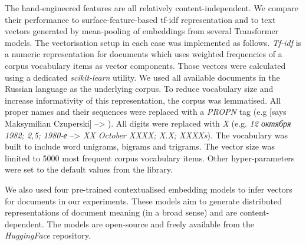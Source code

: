The hand-engineered features are all relatively content-independent. We compare their performance to surface-feature-based \gls{tf-idf} representation and to text vectors generated by mean-pooling of embeddings from several Transformer models. 
The vectorisation setup in each case was implemented as follows.
\label{pg:tfidf_meth}
\textit{Tf-idf} is a numeric representation for documents which uses weighted frequencies of a corpus vocabulary items as vector components. Those vectors were calculated using a dedicated \textit{scikit-learn} utility. We used all available documents in the Russian language as the underlying corpus. 
To reduce vocabulary size and increase informativity of this representation, the corpus was lemmatised. All proper names and their sequences were replaced with a \textit{PROPN} tag (e.g  [says Maksymilian Czuperski] --> ). All digits were replaced with \textit{X} (e.g. \textit{12 октября 1982; 2,5;  1980-е} --> \textit{XX October XXXX; X.X; XXXXs}). The vocabulary was built to include word unigrams, bigrams and trigrams. The vector size was limited to 5000 most frequent corpus vocabulary items. Other hyper-parameters were set to the default values from the library. 

We also used four pre-trained contextualised embedding models to infer vectors for documents in our experiments. These models aim to generate distributed representations of document meaning (in a broad sense) and are content-dependent. The models are open-source and freely available from the \textit{HuggingFace} repository.

